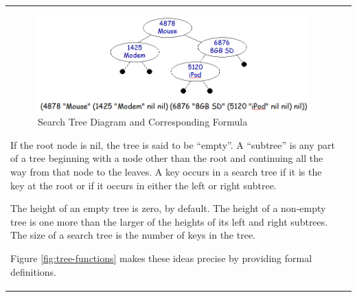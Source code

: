 \begin{tabular}{ll}
\begin{figure}
\begin{center}
\includegraphics[scale=0.5]{images/searchtree.png}
\end{center}
\caption{Search Tree Diagram and Corresponding Formula}
\label{fig:searchtree-diagram}
\end{figure}

\label{empty-tree}
If the root node is nil, the tree is said to be ``empty''.
\label{subtree}
A ``subtree'' is any part of a tree beginning with a node
other than the root
and continuing all the way from that node to the leaves.
A key occurs in a search tree if it is the key at the root
or if it occurs in either the left or right subtree.

The height of an empty tree is zero, by default.
The height of a non-empty tree is one more than the 
larger of the heights of its left and right subtrees.
The size of a search tree is the number of keys in the tree.

Figure \ref{fig:tree-functions} makes these ideas precise
by providing formal definitions.


\end{tabular}
